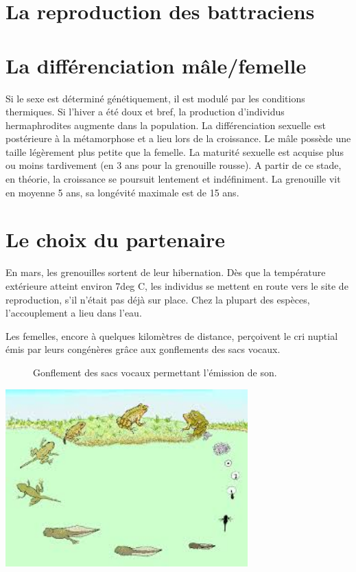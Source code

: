 \section{La reproduction des battraciens}



\section{La différenciation mâle/femelle}

Si le sexe est déterminé génétiquement, il est modulé par les conditions thermiques. Si l’hiver a été doux et bref, la production d’individus hermaphrodites augmente dans la population.
La différenciation sexuelle est postérieure à la métamorphose et a lieu lors de la croissance.
Le mâle possède une taille légèrement plus petite que la femelle.
La maturité sexuelle est acquise plus ou moins tardivement (en 3 ans pour la grenouille rousse). A partir de ce stade, en théorie, la croissance se poursuit lentement et indéfiniment. La grenouille vit en moyenne 5 ans, sa longévité maximale est de 15 ans.
        
\section{Le choix du partenaire}
En mars, les grenouilles sortent de leur hibernation.  Dès que la température extérieure atteint environ 7deg C, les individus se mettent en route vers le site de reproduction, s’il n’était pas déjà sur place. Chez la plupart des espèces, l’accouplement a lieu dans l’eau.

Les femelles, encore à quelques kilomètres de distance, perçoivent le cri nuptial émis par leurs congénères grâce aux gonflements des sacs vocaux.


\begin{figure}
	\begin{center}
	\end{center}
	\caption{Gonflement des sacs vocaux permettant l'émission de son.}
	\label{fig:encordee}
\end{figure}


 
\includegraphics[width=0.7\textwidth]{laRepro/cycleReproduction.jpg}
